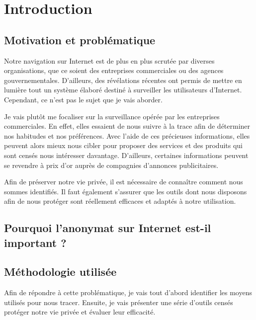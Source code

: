 \chapter{Introduction}
\section{Motivation et problématique}
Notre navigation sur Internet est de plus en plus scrutée par diverses organisations, que ce soient des entreprises commerciales ou des agences gouvernementales. D'ailleurs, des révélations récentes ont permis de mettre en lumière tout un système élaboré destiné à surveiller les utilisateurs d'Internet. Cependant, ce n'est pas le sujet que je vais aborder.

Je vais plutôt me focaliser sur la surveillance opérée par les entreprises commerciales. En effet, elles essaient de nous suivre à la trace afin de déterminer nos habitudes et nos préférences. Avec l'aide de ces précieuses informations, elles peuvent alors mieux nous cibler pour proposer des services et des produits qui sont censés nous intéresser davantage. D'ailleurs, certaines informations peuvent se revendre à prix d'or auprès de compagnies d'annonces publicitaires.

Afin de préserver notre vie privée, il est nécessaire de connaître comment nous sommes identifiés. Il faut également s'assurer que les outils dont nous disposons afin de nous protéger sont réellement efficaces et adaptés à notre utilisation.

\section{Pourquoi l'anonymat sur Internet est-il important ?}

\section{Méthodologie utilisée}
Afin de répondre à cette problématique, je vais tout d'abord identifier les moyens utilisés pour nous tracer. Ensuite, je vais présenter une série d'outils censés protéger notre vie privée et évaluer leur efficacité.
